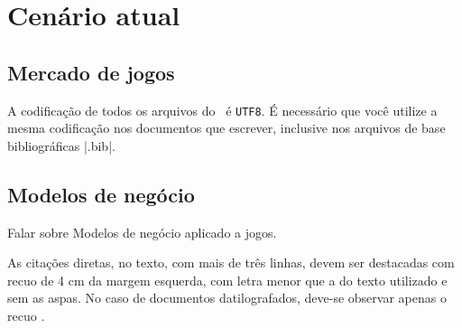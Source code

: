 
 
\chapter{Cenário atual}\label{cap_exemplos}


\section{Mercado de jogos}

A codificação de todos os arquivos do \abnTeX\ é \texttt{UTF8}. É necessário que
você utilize a mesma codificação nos documentos que escrever, inclusive nos
arquivos de base bibliográficas |.bib|.

\section{Modelos de negócio}

Falar sobre Modelos de negócio aplicado a jogos.

\begin{citacao}
As citações diretas, no texto, com mais de três linhas, devem ser
destacadas com recuo de 4 cm da margem esquerda, com letra menor que a do texto
utilizado e sem as aspas. No caso de documentos datilografados, deve-se
observar apenas o recuo \cite[5.3]{NBR10520:2002}.
\end{citacao}


